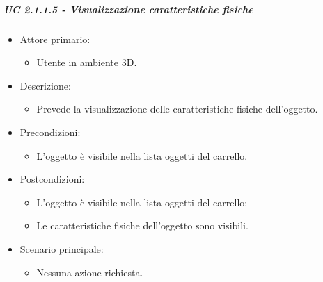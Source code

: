 \subparagraph{UC 2.1.1.5 - Visualizzazione caratteristiche fisiche}
\begin{itemize}
	
	\item Attore primario: 
	\begin{itemize}
		\item Utente in ambiente 3D.
	\end{itemize}
	\item Descrizione:
	\begin{itemize}
		\item Prevede la visualizzazione delle caratteristiche fisiche dell'oggetto.
	\end{itemize}
	
	\item Precondizioni:
	\begin{itemize}
		\item L'oggetto è visibile nella lista oggetti del carrello.
	\end{itemize}
	
	\item Postcondizioni:
	\begin{itemize}
		\item L'oggetto è visibile nella lista oggetti del carrello;
		\item Le caratteristiche fisiche dell'oggetto sono visibili.
	\end{itemize}
	
	\item Scenario principale:
	\begin{itemize}
		\item Nessuna azione richiesta.
	\end{itemize}
	
\end{itemize}

